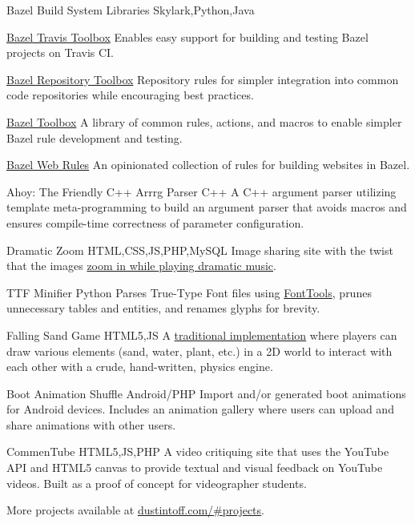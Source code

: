 \personalProject {} {Bazel Build System Libraries} {Skylark,Python,Java} {
    \begin {minimalItemize}
        \item \href {https://github.com/quittle/bazel_travis_toolbox} {Bazel Travis Toolbox} \spaceendash Enables easy support for building and testing Bazel projects on Travis CI\@.
        \item \href {https://github.com/quittle/bazel_repository_toolbox} {Bazel Repository Toolbox} \spaceendash Repository rules for simpler integration into common code repositories while encouraging best practices.
        \item \href {https://github.com/quittle/bazel_toolbox} {Bazel Toolbox} \spaceendash A library of common rules, actions, and macros to enable simpler Bazel rule development and testing.
        \item \href {https://github.com/quittle/rules_web} {Bazel Web Rules} \spaceendash An opinionated collection of rules for building websites in Bazel.
    \end {minimalItemize}
}

 {Ahoy: The Friendly C++ Arrrg Parser} {C++} {
    A C++ argument parser utilizing template meta-programming to build an argument parser that avoids macros and ensures compile-time correctness of parameter configuration.
}

 {Dramatic Zoom} {HTML,CSS,JS,PHP,MySQL} {
    Image sharing site with the twist that the images \href {https://youtu.be/a1Y73sPHKxw} {zoom in while playing dramatic music}.
}

\personalProject {} {TTF Minifier} {Python} {
    Parses True-Type Font files using \href {https://github.com/fonttools/fonttools} {FontTools}, prunes unnecessary tables and entities, and renames glyphs for brevity.
}

 {Falling Sand Game} {HTML5,JS} {
    A \href {https://en.wikipedia.org/wiki/Falling-sand_game} {traditional implementation} where players can draw various elements (sand, water, plant, etc.) in a 2D world to interact with each other with a crude, hand-written, physics engine.
}

 {Boot Animation Shuffle} {Android/PHP} {
    Import and/or generated boot animations for Android devices. Includes an animation gallery where users can upload and share animations with other users.
}

 {CommenTube} {HTML5,JS,PHP} {
    A video critiquing site that uses the YouTube API and HTML5 canvas to provide textual and visual feedback on YouTube videos. Built as a proof of concept for videographer students.
}

More projects available at {\color {slateblue} \href {http://dustintoff.com/\#projects} {dustintoff.com/\#projects}}.